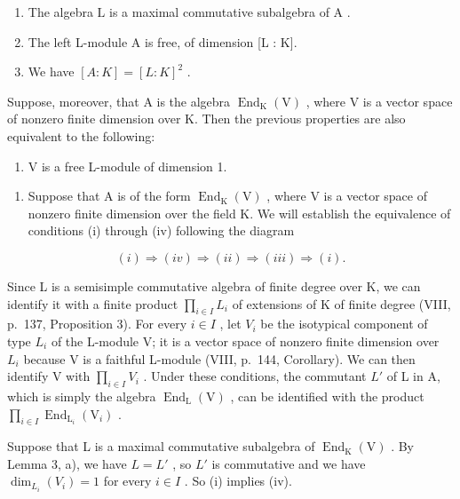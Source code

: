 \begin{enumerate}
\def\labelenumi{(\roman{enumi})}
\item
  The algebra \(\mathrm{L}\) is a maximal commutative subalgebra of \(\mathrm{A}\) .
\item
  The left L-module A is free, of dimension {[}L : K{]}.
\item
  We have \([A:K]=[L:K]^{2}\) .
\end{enumerate}

Suppose, moreover, that A is the algebra \(\operatorname{End}_{\mathrm{K}}(\mathrm{V})\) , where V is a vector space of nonzero finite dimension over K. Then the previous properties are also equivalent to the following:

\begin{enumerate}
\def\labelenumi{(\roman{enumi})}
\setcounter{enumi}{3}
\tightlist
\item
  V is a free L-module of dimension 1.
\end{enumerate}

\begin{enumerate}
\def\labelenumi{\Alph{enumi})}
\tightlist
\item
  Suppose that A is of the form \(\operatorname{End}_{\mathrm{K}}(\mathrm{V})\) , where V is a vector space of nonzero finite dimension over the field K. We will establish the equivalence of conditions (i) through (iv) following the diagram
\end{enumerate}

\[
(i) \Longrightarrow (i v) \Longrightarrow (i i) \Longrightarrow (i i i) \Longrightarrow (i).
\]

Since L is a semisimple commutative algebra of finite degree over K, we can identify it with a finite product \(\prod_{i\in I}L_{i}\) of extensions of K of finite degree (VIII, p.~137, Proposition 3). For every \(i\in I\) , let \(V_{i}\) be the isotypical component of type \(L_{i}\) of the L-module V; it is a vector space of nonzero finite dimension over \(L_{i}\) because V is a faithful L-module (VIII, p.~144, Corollary). We can then identify V with \(\prod_{i\in I}V_{i}\) . Under these conditions, the commutant \(L'\) of L in A, which is simply the algebra \(\operatorname{End}_{\mathrm{L}}(\mathrm{V})\) , can be identified with the product \(\prod_{i\in I}\operatorname{End}_{\mathrm{L}_{i}}(\mathrm{V}_{i})\) .

Suppose that L is a maximal commutative subalgebra of \(\operatorname{End}_{\mathrm{K}}(\mathrm{V})\) . By Lemma 3, a), we have \(L = L'\) , so \(L'\) is commutative and we have \(\dim_{L_i}(V_i) = 1\) for every \(i \in I\) . So (i) implies (iv).

